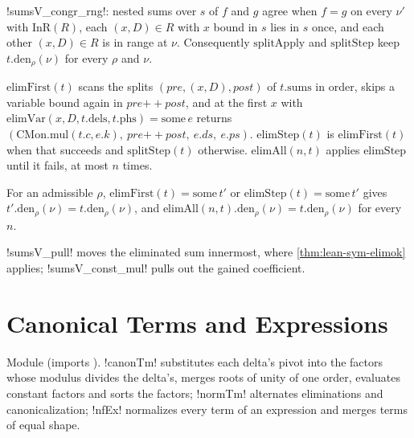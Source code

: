 \begin{theorem}
\lean!sumsV_congr_rng!: nested sums over $s$ of $f$ and $g$ agree when $f=g$ on every $\nu'$ with $\mathrm{InR}(R)$, each $(x,D)\in R$ with $x$ bound in $s$ lies in $s$ once, and each other $(x,D)\in R$ is in range at $\nu$. Consequently $\mathrm{splitApply}$ and $\mathrm{splitStep}$ keep $t.\mathrm{den}_\rho(\nu)$ for every $\rho$ and $\nu$.
\end{theorem}

\begin{definition}
$\mathrm{elimFirst}(t)$ scans the splits $(\mathit{pre},(x,D),\mathit{post})$ of $t.\mathrm{sums}$ in order, skips a variable bound again in $\mathit{pre}\mathbin{+\!\!+}\mathit{post}$, and at the first $x$ with $\mathrm{elimVar}(x,D,t.\mathrm{dels},t.\mathrm{phs})=\mathrm{some}\,e$ returns $(\mathrm{CMon.mul}(t.c,e.k),\ \mathit{pre}\mathbin{+\!\!+}\mathit{post},\ e.ds,\ e.ps)$. $\mathrm{elimStep}(t)$ is $\mathrm{elimFirst}(t)$ when that succeeds and $\mathrm{splitStep}(t)$ otherwise. $\mathrm{elimAll}(n,t)$ applies $\mathrm{elimStep}$ until it fails, at most $n$ times.
\end{definition}

\begin{theorem}
For an admissible $\rho$, $\mathrm{elimFirst}(t)=\mathrm{some}\,t'$ or $\mathrm{elimStep}(t)=\mathrm{some}\,t'$ gives $t'.\mathrm{den}_\rho(\nu)=t.\mathrm{den}_\rho(\nu)$, and $\mathrm{elimAll}(n,t).\mathrm{den}_\rho(\nu)=t.\mathrm{den}_\rho(\nu)$ for every $n$.
\end{theorem}

\lean!sumsV_pull! moves the eliminated sum innermost, where \cref{thm:lean-sym-elimok} applies; \lean!sumsV_const_mul! pulls out the gained coefficient.

\section{Canonical Terms and Expressions}\label{sec:lean-sym-canon}

Module  (imports ). \lean!canonTm! substitutes each delta's pivot into the factors whose modulus divides the delta's, merges roots of unity of one order, evaluates constant factors and sorts the factors; \lean!normTm! alternates eliminations and canonicalization; \lean!nfEx! normalizes every term of an expression and merges terms of equal shape.

